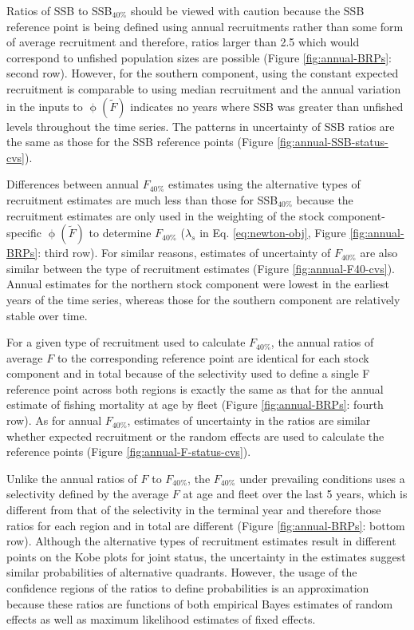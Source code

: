 \documentclass[
]{article}
\begin{document}
Ratios of SSB to SSB\(_{40\%}\) should be viewed with caution because the SSB reference point is being defined using annual recruitments rather than some form of average recruitment and therefore, ratios larger than 2.5 which would correspond to unfished population sizes are possible (Figure \ref{fig:annual-BRPs}: second row). However, for the southern component, using the constant expected recruitment is comparable to using median recruitment and the annual variation in the inputs to \(\upphi(\widetilde{F})\) indicates no years where SSB was greater than unfished levels throughout the time series. The patterns in uncertainty of SSB ratios are the same as those for the SSB reference points (Figure \ref{fig:annual-SSB-status-cvs}).

Differences between annual \(F_{40\%}\) estimates using the alternative types of recruitment estimates are much less than those for SSB\(_{40\%}\) because the recruitment estimates are only used in the weighting of the stock component-specific \(\upphi(\widetilde{F})\) to determine \(F_{40\%}\) (\(\lambda_s\) in Eq. \ref{eq:newton-obj}, Figure \ref{fig:annual-BRPs}: third row). For similar reasons, estimates of uncertainty of \(F_{40\%}\) are also similar between the type of recruitment estimates (Figure \ref{fig:annual-F40-cvs}). Annual estimates for the northern stock component were lowest in the earliest years of the time series, whereas those for the southern component are relatively stable over time.

For a given type of recruitment used to calculate \(F_{40\%}\), the annual ratios of average \(F\) to the corresponding reference point are identical for each stock component and in total because of the selectivity used to define a single F reference point across both regions is exactly the same as that for the annual estimate of fishing mortality at age by fleet (Figure \ref{fig:annual-BRPs}: fourth row). As for annual \(F_{40\%}\), estimates of uncertainty in the ratios are similar whether expected recruitment or the random effects are used to calculate the reference points (Figure \ref{fig:annual-F-status-cvs}).

Unlike the annual ratios of \(F\) to \(F_{40\%}\), the \(F_{40\%}\) under prevailing conditions uses a selectivity defined by the average \(F\) at age and fleet over the last 5 years, which is different from that of the selectivity in the terminal year and therefore those ratios for each region and in total are different (Figure \ref{fig:annual-BRPs}: bottom row). Although the alternative types of recruitment estimates result in different points on the Kobe plots for joint status, the uncertainty in the estimates suggest similar probabilities of alternative quadrants. However, the usage of the confidence regions of the ratios to define probabilities is an approximation because these ratios are functions of both empirical Bayes estimates of random effects as well as maximum likelihood estimates of fixed effects.
\end{document}
